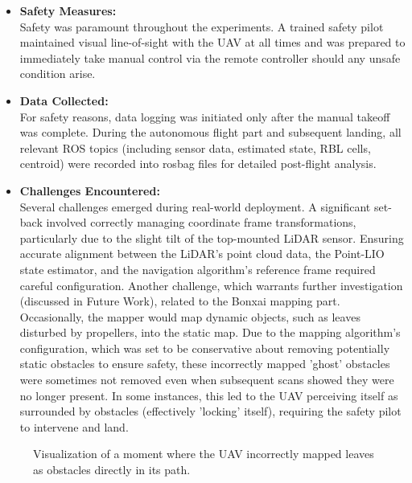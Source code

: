 \begin{itemize}
                \item \textbf{Safety Measures: } \\
                    Safety was paramount throughout the experiments. 
                    A trained safety pilot maintained visual line-of-sight with the UAV at all times and was prepared to immediately take manual control via the remote controller should any unsafe condition arise.
                \item \textbf{Data Collected: } \\
                    For safety reasons, data logging was initiated only after the manual takeoff was complete. 
                    During the autonomous flight part and subsequent landing, all relevant ROS topics (including sensor data, estimated state, \ac{RBL} cells, centroid) were recorded into rosbag files for detailed post-flight analysis.
                \item \textbf{Challenges Encountered: } \\
                    Several challenges emerged during real-world deployment. 
                    A significant set-back involved correctly managing coordinate frame transformations, particularly due to the slight tilt of the top-mounted LiDAR sensor. 
                    Ensuring accurate alignment between the LiDAR's point cloud data, the Point-LIO state estimator, and the navigation algorithm's reference frame required careful configuration. 
                    Another challenge, which warrants further investigation (discussed in Future Work), related to the Bonxai mapping part. 
                    Occasionally, the mapper would map dynamic objects, such as leaves disturbed by propellers, into the static map. 
                    Due to the mapping algorithm's configuration, which was set to be conservative about removing potentially static obstacles to ensure safety, these incorrectly mapped 'ghost' obstacles were sometimes not removed even when subsequent scans showed they were no longer present. 
                    In some instances, this led to the UAV perceiving itself as surrounded by obstacles (effectively 'locking' itself), requiring the safety pilot to intervene and land.
            \end{itemize}

            \begin{figure}[H]
                \centering
                \caption{
                    Visualization of a moment where the UAV incorrectly mapped leaves as obstacles directly in its path.
                }
                \label{fig:map_fail}
            \end{figure}

